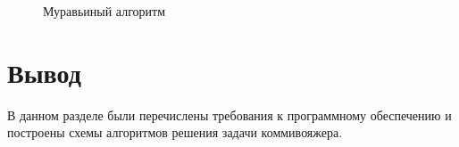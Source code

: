 \begin{figure}[h!]
	\caption{Муравьиный алгоритм}
	\label{fig:ant}
\end{figure}

\clearpage

\section*{Вывод}

В данном разделе были перечислены требования к программному обеспечению и построены схемы алгоритмов решения задачи коммивояжера.
